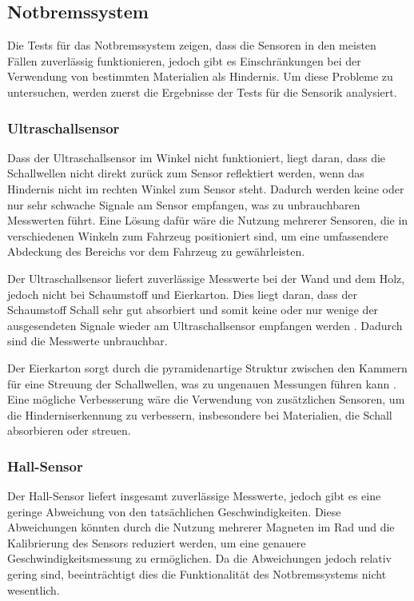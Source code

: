     \subsection{Notbremssystem}
    Die Tests für das Notbremssystem zeigen, dass die Sensoren in den meisten Fällen zuverlässig funktionieren, jedoch gibt es Einschränkungen bei der Verwendung von bestimmten Materialien als Hindernis. Um diese Probleme zu untersuchen, werden zuerst die Ergebnisse der Tests für die Sensorik analysiert.
        \subsubsection{Ultraschallsensor}
        Dass der Ultraschallsensor im Winkel nicht funktioniert, liegt daran, dass die Schallwellen nicht direkt zurück zum Sensor reflektiert werden, wenn das Hindernis nicht im rechten Winkel zum Sensor steht. Dadurch werden keine oder nur sehr schwache Signale am Sensor empfangen, was zu unbrauchbaren Messwerten führt. Eine Lösung dafür wäre die Nutzung mehrerer Sensoren, die in verschiedenen Winkeln zum Fahrzeug positioniert sind, um eine umfassendere Abdeckung des Bereichs vor dem Fahrzeug zu gewährleisten. 

        Der Ultraschallsensor liefert zuverlässige Messwerte bei der Wand und dem Holz, jedoch nicht bei Schaumstoff und Eierkarton. Dies liegt daran, dass der Schaumstoff Schall sehr gut absorbiert und somit keine oder nur wenige der ausgesendeten Signale wieder am Ultraschallsensor empfangen werden \cite[S. 11 f.]{Schallabsorber}. Dadurch sind die Messwerte unbrauchbar.

        Der Eierkarton sorgt durch die pyramidenartige Struktur zwischen den Kammern für eine Streuung der Schallwellen, was zu ungenauen Messungen führen kann \cite[S. 2]{StudyEffectivenessEgg}.
        Eine mögliche Verbesserung wäre die Verwendung von zusätzlichen Sensoren, um die Hinderniserkennung zu verbessern, insbesondere bei Materialien, die Schall absorbieren oder streuen.

        \subsubsection{Hall-Sensor}
        Der Hall-Sensor liefert insgesamt zuverlässige Messwerte, jedoch gibt es eine geringe Abweichung von den tatsächlichen Geschwindigkeiten. Diese Abweichungen könnten durch die Nutzung mehrerer Magneten im Rad und die Kalibrierung des Sensors reduziert werden, um eine genauere Geschwindigkeitsmessung zu ermöglichen. Da die Abweichungen jedoch relativ gering sind, beeinträchtigt dies die Funktionalität des Notbremssystems nicht wesentlich.

